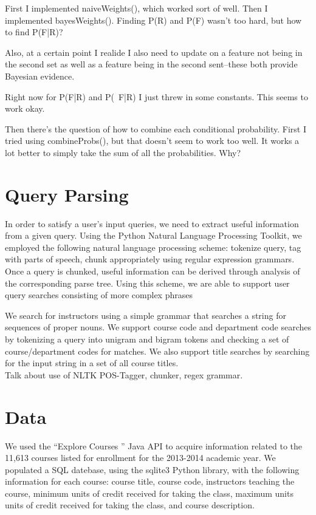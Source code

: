 \documentclass[12pt]{article}
\begin{document}
First I implemented naiveWeights(), which worked sort of well. Then I implemented bayesWeights(). Finding P(R) and P(F) wasn't too hard, but how to find P(F|R)?

Also, at a certain point I realide I also need to update on a feature not being in the second set as well as a feature being in the second sent--these both provide Bayesian evidence.

Right now for P(F|R) and P(~F|R) I just threw in some constants. This seems to work okay.

Then there's the question of how to combine each conditional probability. First I tried using combineProbs(), but that doesn't seem to work too well. It works a lot better to simply take the sum of all the probabilities. Why?

\section*{Query Parsing}
In order to satisfy a user's input queries, we need to extract useful information from a given query. Using the Python Natural Language Processing Toolkit, we employed the following natural language processing scheme: tokenize query, tag with parts of speech, chunk appropriately using regular expression grammars. Once a query is chunked, useful information can be derived through analysis of the corresponding parse tree. Using this scheme, we are able to support user query searches consisting of more complex phrases 

We search for instructors using a simple grammar that searches a string for sequences of proper nouns. We support course code and department code searches by tokenizing a query into unigram and bigram tokens and checking a set of course/department codes for matches. We also support title searches by searching for the input string in a set of all course titles.\\
Talk about use of NLTK POS-Tagger, chunker, regex grammar.

\section*{Data}
	 We used the ``Explore Courses '' Java API to acquire information related to the 11,613 courses listed for enrollment for the 2013-2014 academic year. We populated a SQL datebase, using the sqlite3 Python library, with the following information for each course: course title, course code, instructors teaching the course, minimum units of credit received for taking the class, maximum units units of credit received for taking the class, and course description. \\
\end{document}
